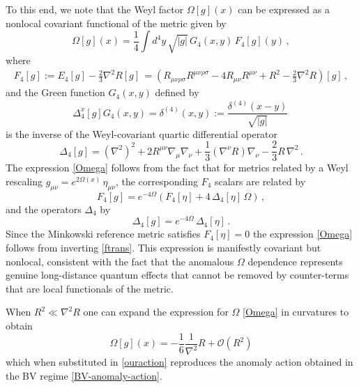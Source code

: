 \documentclass[12pt,a4paper]{article}
\newcommand{\be}{\begin{equation}}
\newcommand{\ee}{\end{equation}}
\renewcommand{\d}{\delta}
\newcommand{\m}{\mu}
\newcommand{\n}{\nu}
\renewcommand{\r}{\rho}
\newcommand{\s}{\sigma}
\renewcommand{\O}{\Omega}
\newcommand{\1}{{\textbf{1}}}
\newcommand{\+}{{\,+ \,}}
\begin{document}
To this end, we note  that the  Weyl factor $\Omega[g](x)$ can be expressed as a nonlocal covariant functional of the metric \cite{Fradkin:1978yf, Paneitz:2008, Riegert:1984kt} given by
\begin{equation}\label{Omega}
 \O[g](x)= \frac{1}{4}\int\! d^4 y\,\sqrt{|g|}\, G_4(x,y)\, F_4[g](y) \, ,
\end{equation}
where 
\begin{align}\label{F4}
F_4[g] := E_4[g]-\frac{2}{3} \nabla^2 R[g]\,  = (R_{\m\n\r\s} R^{\m\n\r\s} - 4 R_{\m\n}R^{\m\n} +        R^{2}-\frac{2}{3} \nabla^{2} R )[g] \, ,
\end{align}
and the Green function $G_{4}(x,y)$ defined by 
\be
\Delta^{x}_4[g] G_{4}(x, y) = \d^{(4)}(x, y) :=\frac{ \d^{(4)}(x -y) }{\sqrt{|g|}}\, 
\ee
is the inverse of the Weyl-covariant quartic differential operator 
\begin{equation}\label{diff-op}
 \Delta_4[g]= \left( \nabla^2 \right)^2 + 2 R^{\m\n}  \nabla_{\m}\nabla_{\n} + \frac{1}{3}\left(\nabla^{\n}R\right)\nabla_{\n} - \frac{2}{3}R\, \nabla^2 \, . 
\end{equation}
The expression \eqref{Omega} follows from the fact that for metrics  related by a Weyl rescaling $g_{\m\n}=e^{2\O(x)}\, {\eta}_{\m\n}$,
the corresponding $F_{4}$ scalars are related by
\begin{equation}\label{ftrans}
 F_4[ g] = e^{-4\O} \left( F_4[ \eta] +4  \, \Delta_4 [ \eta]\, \O \right)\, ,
\end{equation}
and the operators $\Delta_{4}$ by
\begin{equation}
\Delta_4[g]= e^{-4\O}\, \Delta_4[ \eta] \, .
\end{equation}
Since the Minkowski  reference metric satisfies
$F_4[ \eta]=0$ the  expression \eqref{Omega} follows from  inverting \eqref{ftrans}. 
This expression is manifestly covariant but nonlocal, consistent with the fact that  the anomalous $\O$ dependence  represents genuine long-distance quantum effects that cannot be removed by counter-terms that are local functionals of the metric.

When $ R^2 \ll \nabla^2 R $ one can expand the expression for $\O$ \eqref{Omega}  in curvatures to obtain
\be {\O}[g] (x)= -\frac{1}{6}\frac{1}{\nabla^{2}}R + \mathcal{O}(R^2) \ee
which when substituted in \eqref{ouraction} reproduces the anomaly action obtained in the BV regime \eqref{BV-anomaly-action}.
\end{document}

